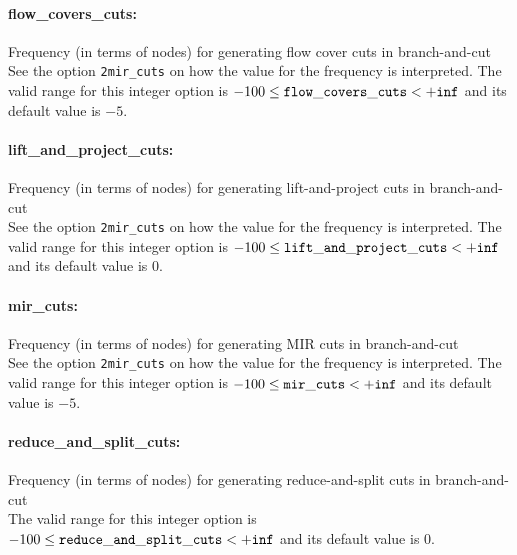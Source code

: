 \paragraph{flow\_covers\_cuts:}\label{sec:flow_covers_cuts} Frequency (in terms of nodes) for generating flow cover cuts in branch-and-cut $\;$ \\
See the option \texttt{2mir\_cuts} on how the value for the frequency is interpreted.
The valid range for this integer option is
$-100 \le {\tt flow\_covers\_cuts } <  {\tt +inf}$
and its default value is $-5$.


\paragraph{lift\_and\_project\_cuts:}\label{sec:lift_and_project_cuts} Frequency (in terms of nodes) for generating lift-and-project cuts in branch-and-cut $\;$ \\
See the option \texttt{2mir\_cuts} on how the value for the frequency is interpreted.
The valid range for this integer option is
$-100 \le {\tt lift\_and\_project\_cuts } <  {\tt +inf}$
and its default value is $0$.


\paragraph{mir\_cuts:}\label{sec:mir_cuts} Frequency (in terms of nodes) for generating MIR cuts in branch-and-cut $\;$ \\
See the option \texttt{2mir\_cuts} on how the value for the frequency is interpreted.
The valid range for this integer option is
$-100 \le {\tt mir\_cuts } <  {\tt +inf}$
and its default value is $-5$.




\paragraph{reduce\_and\_split\_cuts:}\label{sec:reduce_and_split_cuts} Frequency (in terms of nodes) for generating reduce-and-split cuts in branch-and-cut $\;$ \\
The valid range for this integer option is
$-100 \le {\tt reduce\_and\_split\_cuts } <  {\tt +inf}$
and its default value is $0$.


